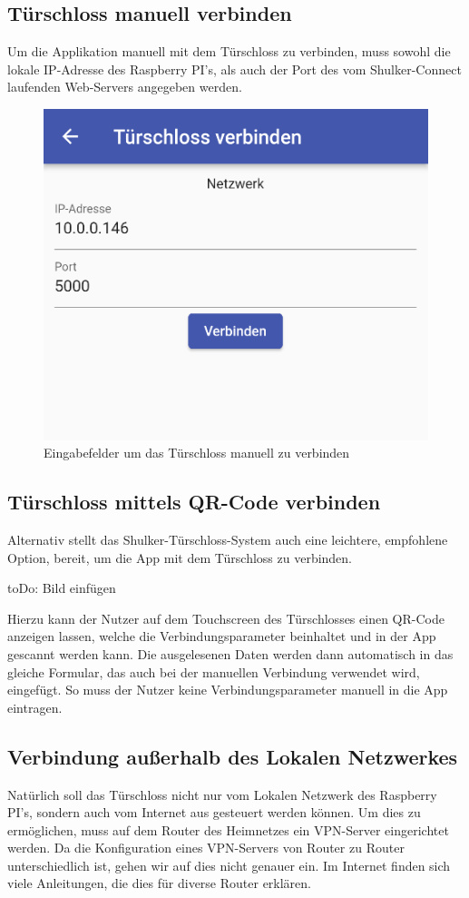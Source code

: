 \subsection{Türschloss manuell verbinden}
Um die Applikation manuell mit dem Türschloss zu verbinden, muss sowohl die lokale IP-Adresse des Raspberry PI's, als
auch der Port des vom Shulker-Connect laufenden Web-Servers angegeben werden.

\begin{figure}[H]
    \begin{center}
        \includegraphics[width=.6\textwidth]{images/mobile/ManualConnect.png}
        \caption{Eingabefelder um das Türschloss manuell zu verbinden}
    \end{center}
\end{figure}

\subsection{Türschloss mittels QR-Code verbinden}
Alternativ stellt das Shulker-Türschloss-System auch eine leichtere, empfohlene Option, bereit, um die App mit dem Türschloss
zu verbinden.

toDo: Bild einfügen

Hierzu kann der Nutzer auf dem Touchscreen des Türschlosses einen QR-Code anzeigen lassen, welche die Verbindungsparameter
beinhaltet und in der App gescannt werden kann. Die ausgelesenen Daten werden dann automatisch in das gleiche Formular,
das auch bei der manuellen Verbindung verwendet wird, eingefügt. So muss der Nutzer keine Verbindungsparameter manuell
in die App eintragen.

\subsection{Verbindung außerhalb des Lokalen Netzwerkes}
Natürlich soll das Türschloss nicht nur vom Lokalen Netzwerk des Raspberry PI's, sondern auch vom Internet aus 
gesteuert werden können.
Um dies zu ermöglichen, muss auf dem Router des Heimnetzes ein VPN-Server eingerichtet werden.
Da die Konfiguration eines VPN-Servers von Router zu Router unterschiedlich ist, gehen wir auf dies nicht genauer ein.
Im Internet finden sich viele Anleitungen, die dies für diverse Router erklären.

